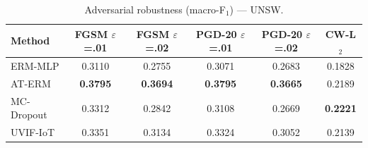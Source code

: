 \begin{table}[t]
\caption{Adversarial robustness (macro-F$_1$) — UNSW.}
\label{tab:adv_unsw}
\centering
\begin{tabular}{lccccc}
\toprule
Method & FGSM $\varepsilon$=.01 & FGSM $\varepsilon$=.02 & PGD-20 $\varepsilon$=.01 & PGD-20 $\varepsilon$=.02 & CW-L$_2$ \\
\midrule
ERM-MLP & 0.3110 & 0.2755 & 0.3071 & 0.2683 & 0.1828 \\
AT-ERM & \textbf{0.3795} & \textbf{0.3694} & \textbf{0.3795} & \textbf{0.3665} & 0.2189 \\
MC-Dropout & 0.3312 & 0.2842 & 0.3108 & 0.2669 & \textbf{0.2221} \\
UVIF-IoT & 0.3351 & 0.3134 & 0.3324 & 0.3052 & 0.2139 \\
\bottomrule
\end{tabular}
\end{table}